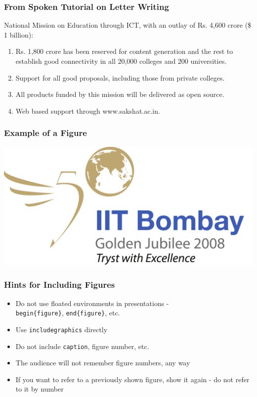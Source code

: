 
\begin{frame}
  \frametitle{From Spoken Tutorial on Letter
    Writing}
National Mission on Education through ICT, with an
outlay of Rs. 4,600 crore (\$ 1 billion): \pause
\begin{enumerate}
\item<+-|alert@+> Rs. 1,800 crore has been reserved for
  content generation and the rest to establish good
  connectivity in all 20,000 colleges and 200
  universities.
\item<+-|alert@+> Support for all good proposals,
  including those from private colleges.
\item<+-|alert@+> All products funded by this mission
  will be delivered as open source.
\item<+-|alert@+> Web based support through
  www.sakshat.ac.in.
\end{enumerate}
\end{frame}



\begin{frame}
\frametitle{Example of a Figure}
\begin{center}
\includegraphics[width=\linewidth]{iitb}
\end{center}
\end{frame}

\begin{frame}
\frametitle{Hints for Including Figures}
\begin{itemize}
\item<+-> Do not use floated environments in
  presentations 
  - \\ {\tt begin\{figure\}}, {\tt end\{figure\}}, 
  etc. 
\item<+-> Use {\tt includegraphics} directly
\item<+-> Do not include {\tt caption}, figure
  number, etc.
\item<+-> The audience will not remember figure
  numbers, any way
\item<+-> If you want to refer to a previously
  shown figure, show it again - do not refer to it
  by number
\end{itemize}
\end{frame}

